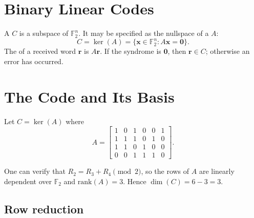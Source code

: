 \section{Binary Linear Codes}

A  $C$ is a subspace of $\mathbb{F}_2^n$. It may be
specified as the nullspace of a  $A$:
\[
    C = \ker(A) = \{\mathbf{x} \in \mathbb{F}_2^n : A\mathbf{x} = \mathbf{0}\}.
\]
The  of a received word $\mathbf{r}$ is $A\mathbf{r}$.
If the syndrome is $\mathbf{0}$, then $\mathbf{r} \in C$; otherwise an error
has occurred.

\section{The Code and Its Basis}

Let $C = \ker(A)$ where
\[
    A =
    \begin{bmatrix}
        1 & 0 & 1 & 0 & 0 & 1 \\
        1 & 1 & 1 & 0 & 1 & 0 \\
        1 & 1 & 0 & 1 & 0 & 0 \\
        0 & 0 & 1 & 1 & 1 & 0
    \end{bmatrix}.
\]


\begin{note}
One can verify that $R_2 = R_3 + R_4 \pmod{2}$, so the rows of $A$ are
linearly dependent over $\mathbb{F}_2$ and $\mathrm{rank}(A) = 3$.
Hence $\dim(C) = 6 - 3 = 3$.
\end{note}

\subsection{Row reduction}

